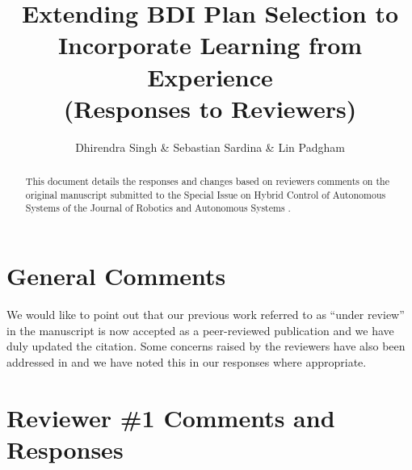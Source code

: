 \documentclass[preprint,12pt]{elsarticle}
\begin{document}
\begin{frontmatter}

\title{Extending BDI Plan Selection to Incorporate Learning from Experience\\
(Responses to Reviewers)}

\author{Dhirendra Singh \& Sebastian Sardina \& Lin Padgham}
\address{RMIT University, Melbourne, Australia}

\begin{abstract}
This document details the responses and changes based on reviewers comments on
the original manuscript submitted to the Special Issue on Hybrid Control of
Autonomous Systems of the Journal of Robotics and Autonomous Systems
\cite{Singh:HYCAS10}.
\end{abstract}

\end{frontmatter}


\section*{General Comments}

We would like to point out that our previous work referred to as ``under review''
in the manuscript  is now accepted as a peer-reviewed publication
\cite{Singh:AAMAS10} and we have duly updated the citation. Some concerns raised
by the reviewers have also been addressed in \cite{Singh:AAMAS10} and we have
noted this in our responses where appropriate.

\section{Reviewer \#1 Comments and Responses}

\end{document}
